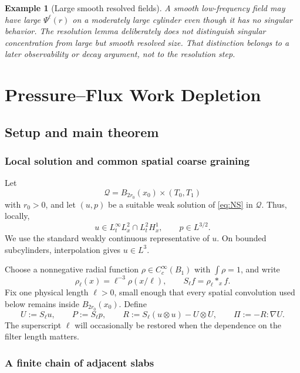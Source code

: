 \documentclass[11pt]{article}
\numberwithin{equation}{section}
\newtheorem{example}[theorem]{Example}
\begin{document}
\begin{example}[Large smooth resolved fields]
A smooth low-frequency field may have large $\Psi^\ell(r)$ on a moderately large cylinder even though it has no singular behavior.  The resolution lemma deliberately does not distinguish singular concentration from large but smooth resolved size.  That distinction belongs to a later observability or decay argument, not to the resolution step.
\end{example}
\section{Pressure--Flux Work Depletion}\label{sec:work-depletion}

\subsection{Setup and main theorem}\label{sec:setup}

\subsubsection{Local solution and common spatial coarse graining}

Let
\[
\mathcal Q=B_{2r_0}(x_0)\times(T_0,T_1)
\]
with \(r_0>0\), and let \((u,p)\) be a suitable weak solution of \eqref{eq:NS} in \(\mathcal Q\). Thus, locally,
\begin{equation}\label{eq:energy-class}
u\in L^\infty_tL^2_x\cap L^2_tH^1_x,
\qquad
p\in L^{3/2}.
\end{equation}
We use the standard weakly continuous representative of \(u\). On bounded subcylinders, interpolation gives \(u\in L^3\).

Choose a nonnegative radial function \(\rho\in C_c^\infty(B_1)\) with \(\int\rho=1\), and write
\[
\rho_\ell(x)=\ell^{-3}\rho(x/\ell),
\qquad
S_\ell f=\rho_\ell*_x f.
\]
Fix one physical length \(\ell>0\), small enough that every spatial convolution used below remains inside \(B_{2r_0}(x_0)\). Define
\begin{equation}\label{eq:coarse-package}
U:=S_\ell u,
\qquad
P:=S_\ell p,
\qquad
R:=S_\ell(u\otimes u)-U\otimes U,
\qquad
\Pi:=-R:\nabla U.
\end{equation}
The superscript \(\ell\) will occasionally be restored when the dependence on the filter length matters.

\subsubsection{A finite chain of adjacent slabs}
\end{document}
